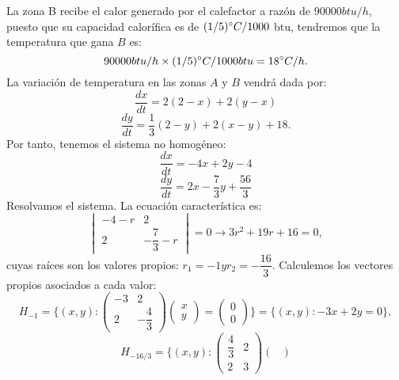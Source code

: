\begin{ejemplo}
	La zona B recibe el calor generado por el calefactor a razón de $90000 btu/h$, puesto que su capacidad calorífica es de  $(1/5)\degree C /1000$ btu, tendremos que la temperatura que gana $B$ es:
	\begin{equation}
		90000 btu/h \times (1/5)\degree C /1000 btu = 18\degree C/h.
	\end{equation}
	La variación de temperatura en las zonas $A$ y $B$ vendrá dada por:
	\begin{equation}
		\dfrac{dx}{dt} = 2(2-x)+2(y-x)
	\end{equation}
	\begin{equation}
		\dfrac{dy}{dt} = \dfrac{1}{3}(2-y)+2(x-y) + 18.
	\end{equation}
	Por tanto, tenemos el sistema no homogéneo:
		\begin{equation}
		\dfrac{dx}{dt} = -4x+2y-4
	\end{equation}
	\begin{equation}
		\dfrac{dy}{dt} = 2x-\dfrac{7}{3}y+\dfrac{56}{3}
	\end{equation}
	Resolvamos el sistema. La ecuación característica es:
	\begin{equation}
		\begin{vmatrix} -4-r & 2 \\ 2 & -\dfrac{7}{3}-r \end{vmatrix} = 0 \rightarrow 3r^2 + 19r + 16 =0,
	\end{equation}
	cuyas raíces son los valores propios: $r_1 = -1 y r_2 = -\dfrac{16}{3}$. Calculemos los vectores propios asociados a cada valor:
	\begin{equation}
		H_{-1} = \{(x,y): \begin{pmatrix}
			-3 & 2\\ 
			2 & -\dfrac{4}{3} 
		\end{pmatrix} \begin{pmatrix}
		x \\ 
		y
		\end{pmatrix} = \begin{pmatrix}
		0 \\ 
		0  
		\end{pmatrix}\} = \{(x,y): -3x + 2y = 0\},
	\end{equation}
	\begin{equation}
		H_{-16/3} = \{(x,y): \begin{pmatrix}
			\dfrac{4}{3} & 2\\ 
			2 & 3
		\end{pmatrix} \begin{pmatrix}

\end{pmatrix}
\end{equation}
\end{ejemplo}
